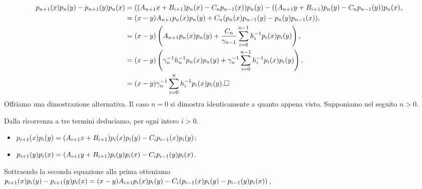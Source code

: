\begin{align*}
p_{n + 1}(x)p_n(y) - p_{n + 1}(y)p_n(x)
&= ((A_{n + 1}x + B_{i + 1})p_n(x) - C_np_{n - 1}(x))p_n(y) -
((A_{n + 1}y + B_{i + 1})p_n(y) - C_np_{n - 1}(y))p_n(x),\\
&= (x - y)A_{n + 1}p_n(x)p_n(y) + C_n(p_n(x)p_{n - 1}(y) - p_n(y)p_{n - 1}(x)),\\
&= (x - y)\left (A_{n + 1}p_n(x)p_n(y) + \frac{C_n}{\gamma_{n - 1}} \sum_{i = 0}^{n - 1} h_i^{-1}p_i(x)p_i(y)\right ),\\
&= (x - y)\left (\gamma_n^{-1}h_n^{-1}p_n(x)p_n(y) + \gamma_n^{-1} \sum_{i = 0}^{n - 1} h_i^{-1}p_i(x)p_i(y)\right ),\\
&= (x - y) \gamma_n^{-1} \sum_{i = 0}^n h_i^{-1}p_i(x)p_i(y).\text{$\square$}
\end{align*}
\Proof Offriamo una dimostrazione alternativa. Il caso $n = 0$ si dimostra identicamente a quanto appena visto. Supponiamo nel seguito $n > 0$.
\par Dalla ricorrenza a tre termini deduciamo, per ogni intero $i > 0$.
\begin{itemize}
	\item $p_{i + 1}(x)p_i(y) = (A_{i + 1}x + B_{i + 1})p_i(x)p_i(y) - C_ip_{i - 1}(x)p_i(y)$;
	\item $p_{i + 1}(y)p_i(x) = (A_{i + 1}y + B_{i + 1})p_i(y)p_i(x) - C_ip_{i - 1}(y)p_i(x)$.
\end{itemize}
\par Sottraendo la seconda equazione alla prima otteniamo
$p_{i + 1}(x)p_i(y) - p_{i + 1}(y)p_i(x) =
(x - y)A_{i + 1}p_i(x)p_i(y) - C_i(p_{i - 1}(x)p_i(y) - p_{i - 1}(y)p_i(x))$,
